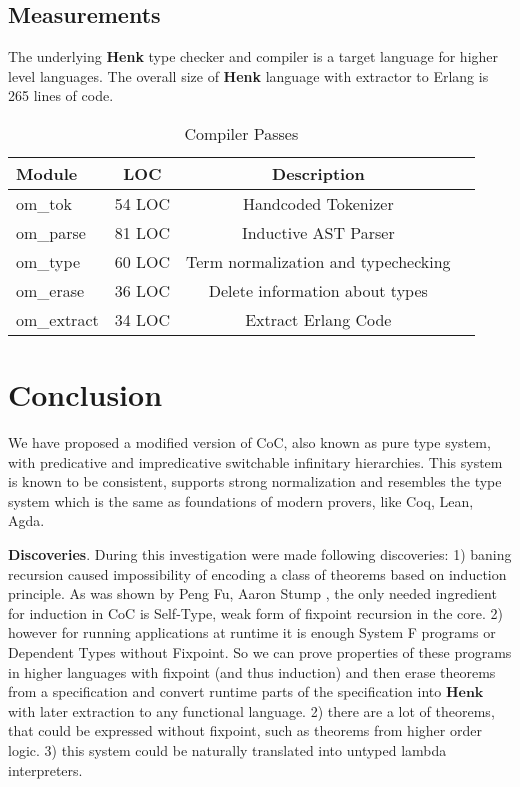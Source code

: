 \documentclass{article}
\begin{document}
\subsection{Measurements}
The underlying {\bf Henk} type checker and compiler is a target language for higher level languages.
The overall size of {\bf Henk} language with extractor to Erlang is 265 lines of code.

\begin{table}[h]
\begin{center}
\caption{Compiler Passes}
\label{tab:passes}
\begin{tabular}{lccc}
\hline
{\bf Module} & {\bf LOC} & {\bf Description}\\
\hline
om\_tok     & 54 LOC & Handcoded Tokenizer\\
om\_parse   & 81 LOC & Inductive AST Parser\\
om\_type    & 60 LOC & Term normalization and typechecking\\
om\_erase   & 36 LOC & Delete information about types\\
om\_extract & 34 LOC & Extract Erlang Code\\
\hline
\end{tabular}
\end{center}
\end{table}

\section{Conclusion}
We have proposed a modified version of CoC, also known as pure type system, with predicative and impredicative switchable infinitary hierarchies.
This system is known to be consistent, supports strong normalization and resembles the type system which is the same as foundations of modern provers, like Coq, Lean, Agda.

{\bf Discoveries}.
 During this investigation were made following discoveries:
1) baning recursion caused impossibility of encoding a class of theorems based on induction principle.
As was shown by Peng Fu, Aaron Stump \cite{Fu14}, the only needed ingredient for induction in CoC is
Self-Type, weak form of fixpoint recursion in the core.
2) however for running applications at runtime it is enough System F programs or Dependent Types without Fixpoint.
So we can prove properties of these programs in higher languages with fixpoint (and thus induction) and then erase
theorems from a specification and convert runtime parts of the specification into $\mathbf{Henk}$ with later
extraction to any functional language.
2) there are a lot of theorems, that could be expressed without fixpoint, such as theorems from higher order logic.
3) this system could be naturally translated into untyped lambda interpreters.
\end{document}
